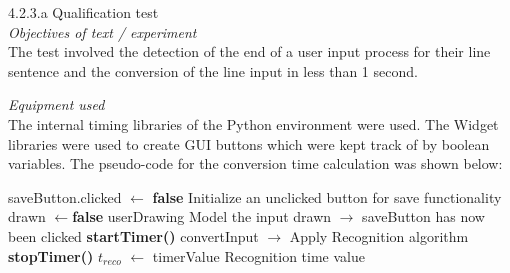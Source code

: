 4.2.3.a Qualification test\\
\textit{Objectives of text / experiment}\\
The test involved the detection of the end of a user input process for their line sentence and the conversion of the line input in less than 1 second.

\textit{Equipment used}\\
The internal timing libraries of the Python environment were used. The Widget libraries were used to create GUI buttons which were kept track of by boolean variables. The pseudo-code for the conversion time calculation was shown below:\\

\begin{algorithmic}
	\STATE saveButton.clicked $\leftarrow$ \textbf{false} \hfill Initialize an unclicked button for save functionality  
	\STATE drawn $\leftarrow$\textbf{false} userDrawing \hfill Model the input drawn
	\ENDWHILE
	\STATE $\rightarrow$ saveButton has now been clicked
	\STATE \textbf{startTimer()}
	\STATE convertInput \hfill $\rightarrow$ Apply Recognition algorithm
	\STATE \textbf{stopTimer()}
	\STATE $t_{reco}$ $\leftarrow$ timerValue	\hfill Recognition time value
\end{algorithmic}

